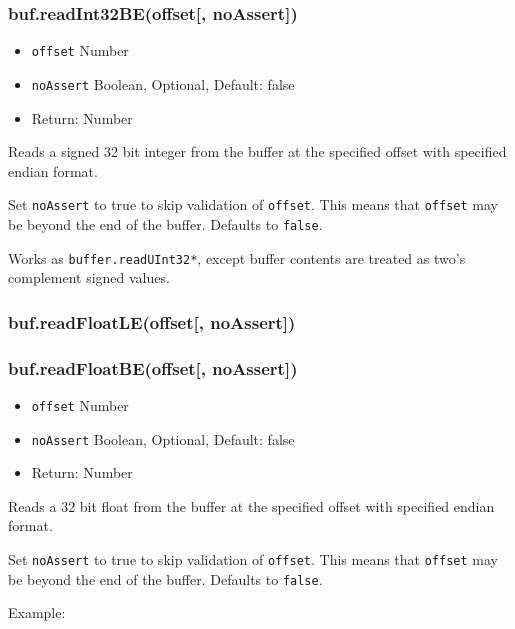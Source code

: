 \subsubsection{buf.readInt32BE(offset{[},
noAssert{]})}\label{buf.readint32beoffset-noassert}

\begin{itemize}
\itemsep1pt\parskip0pt
\item
  \texttt{offset} Number
\item
  \texttt{noAssert} Boolean, Optional, Default: false
\item
  Return: Number
\end{itemize}

Reads a signed 32 bit integer from the buffer at the specified offset
with specified endian format.

Set \texttt{noAssert} to true to skip validation of \texttt{offset}.
This means that \texttt{offset} may be beyond the end of the buffer.
Defaults to \texttt{false}.

Works as \texttt{buffer.readUInt32*}, except buffer contents are treated
as two's complement signed values.

\subsubsection{buf.readFloatLE(offset{[},
noAssert{]})}\label{buf.readfloatleoffset-noassert}

\subsubsection{buf.readFloatBE(offset{[},
noAssert{]})}\label{buf.readfloatbeoffset-noassert}

\begin{itemize}
\itemsep1pt\parskip0pt
\item
  \texttt{offset} Number
\item
  \texttt{noAssert} Boolean, Optional, Default: false
\item
  Return: Number
\end{itemize}

Reads a 32 bit float from the buffer at the specified offset with
specified endian format.

Set \texttt{noAssert} to true to skip validation of \texttt{offset}.
This means that \texttt{offset} may be beyond the end of the buffer.
Defaults to \texttt{false}.

Example:

